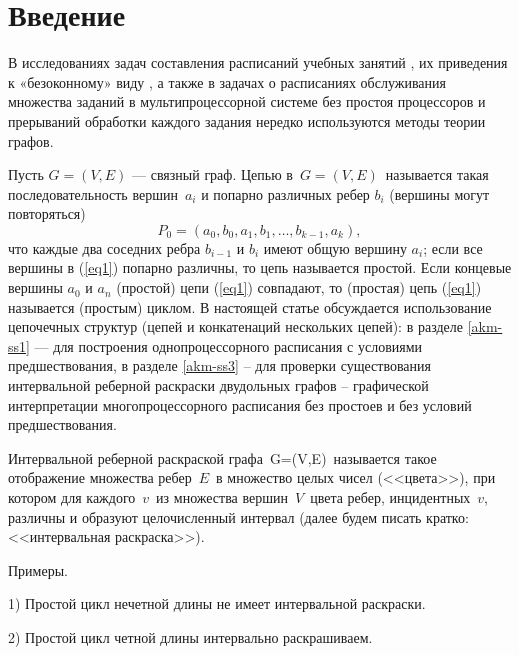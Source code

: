 \section{Введение}
В исследованиях задач составления расписаний учебных занятий
\cite[с.\,403]{akm-1}, их приведения к «безоконному» виду \cite{akm-5}, а также в задачах о расписаниях обслуживания множества заданий в мультипроцессорной системе без простоя процессоров и прерываний обработки каждого задания \cite{akm-3Tanaev} нередко используются методы теории графов.
\par\medskip
Пусть $G=(V,E)$ --- связный граф. Цепью в\ $G=(V,E)$\ называется такая последовательность вершин\ $a_i$ и попарно различных ребер $b_i$ (вершины могут повторяться)
\begin{equation}\label{eq1}
P_0=(a_0,b_0,a_1,b_1,…,b_{k-1},a_k), 			
\end{equation}
что каждые два соседних ребра $b_{i-1}$ и $b_i$ имеют общую вершину $a_i$; если все вершины в (\ref{eq1}) попарно различны, то цепь называется простой. Если концевые вершины  $a_0$ и $a_n$ (простой) цепи (\ref{eq1}) совпадают, то (простая) цепь (\ref{eq1}) называется (простым) циклом. В настоящей статье обсуждается использование цепочечных структур (цепей и конкатенаций нескольких цепей): в разделе \ref{akm-ss1} --- для построения однопроцессорного расписания с условиями предшествования, в разделе \ref{akm-ss3} -- для проверки существования интервальной реберной раскраски двудольных графов -- графической интерпретации многопроцессорного расписания без простоев и без условий предшествования.
\par\medskip
Интервальной реберной раскраской графа\ {G=(V,E)}\ называется такое отображение множества ребер\ $E$\ в множество целых чисел (<<цвета>>), при котором для каждого\ $v$\ из множества вершин\ $V$\ цвета ребер, инцидентных\ $v$, различны и образуют целочисленный интервал (далее будем писать кратко: <<интервальная раскраска>>).
\par\medskip
Примеры.

1) Простой цикл нечетной длины не имеет интервальной раскраски.

2) Простой цикл четной длины интервально раскрашиваем.

